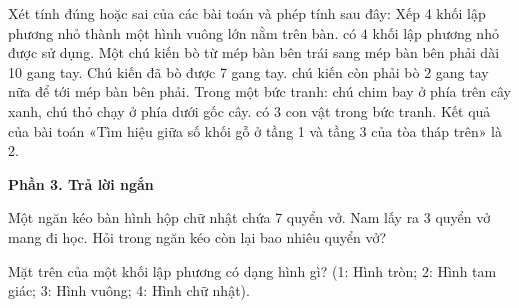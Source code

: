 \begin{ex} %
Xét tính đúng hoặc sai của các bài toán và phép tính sau đây:
\choiceTF
{\True Xếp 4 khối lập phương nhỏ thành một hình vuông lớn nằm trên bàn. có $4$ khối lập phương nhỏ được sử dụng.}
{Một chú kiến bò từ mép bàn bên trái sang mép bàn bên phải dài 10 gang tay. Chú kiến đã bò được 7 gang tay. chú kiến còn phải bò $2$ gang tay nữa để tới mép bàn bên phải.}
{Trong một bức tranh: chú chim bay ở phía trên cây xanh, chú thỏ chạy ở phía dưới gốc cây. có $3$ con vật trong bức tranh.}
{\True Kết quả của bài toán «Tìm hiệu giữa số khối gỗ ở tầng 1 và tầng 3 của tòa tháp trên» là $2$.}
\end{ex}

\textbf{Phần 3. Trả lời ngắn}

\begin{ex} %
Một ngăn kéo bàn hình hộp chữ nhật chứa 7 quyển vở. Nam lấy ra 3 quyển vở mang đi học. Hỏi trong ngăn kéo còn lại bao nhiêu quyển vở?
\end{ex}

\begin{ex} %
Mặt trên của một khối lập phương có dạng hình gì? (1: Hình tròn; 2: Hình tam giác; 3: Hình vuông; 4: Hình chữ nhật).
\end{ex}

